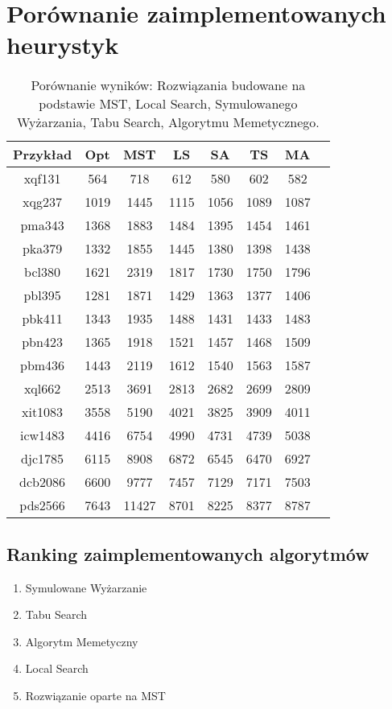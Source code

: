 \documentclass{article}
\begin{document}
\section{Porównanie zaimplementowanych heurystyk}
\begin{table}[h!]
    \centering
    \begin{tabular}{|c|c|c|c|c|c|c|c|}
        \hline
        Przykład & Opt & MST & LS & SA  & TS & MA \\
        \hline
        xqf131 & 564 & 718 & 612 & 580 & 602 & 582 \\
        \hline
        xqg237 & 1019 & 1445 & 1115 & 1056 & 1089 & 1087 \\
        \hline
        pma343 & 1368 & 1883 & 1484 & 1395 & 1454 & 1461 \\
        \hline
        pka379 & 1332 & 1855 & 1445 & 1380 & 1398 & 1438 \\
        \hline
        bcl380 & 1621 & 2319 & 1817 & 1730 & 1750 & 1796 \\
        \hline
        pbl395 & 1281 & 1871 & 1429 & 1363 & 1377 & 1406 \\
        \hline
        pbk411 & 1343 & 1935 & 1488 & 1431 & 1433 & 1483 \\
        \hline
        pbn423 & 1365 & 1918 & 1521 & 1457 & 1468 & 1509 \\
        \hline
        pbm436 & 1443 & 2119 & 1612 & 1540 & 1563 & 1587 \\
        \hline
        xql662 & 2513 & 3691 & 2813 & 2682 & 2699 & 2809 \\
        \hline
        xit1083 & 3558 & 5190 & 4021 & 3825 & 3909 & 4011 \\
        \hline
        icw1483 & 4416 & 6754 & 4990 & 4731 & 4739 & 5038 \\
        \hline
        djc1785 & 6115 & 8908 & 6872 & 6545 & 6470 & 6927 \\
        \hline
        dcb2086 & 6600 & 9777 & 7457 & 7129 & 7171 & 7503 \\
        \hline
        pds2566 & 7643 & 11427 & 8701 & 8225 & 8377 & 8787 \\
        \hline
    \end{tabular}
    \caption{Porównanie wyników: Rozwiązania budowane na podstawie MST, Local Search, Symulowanego Wyżarzania, Tabu Search, Algorytmu Memetycznego.}
\end{table}

\subsection{Ranking zaimplementowanych algorytmów}
\begin{enumerate}
    \item Symulowane Wyżarzanie
    \item Tabu Search
    \item Algorytm Memetyczny
    \item Local Search
    \item Rozwiązanie oparte na MST
\end{enumerate}
\end{document}

